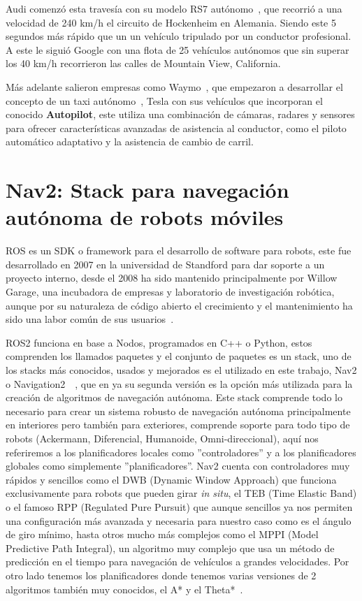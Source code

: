 Audi comenzó esta travesía con su modelo RS7 autónomo~\cite{audirs715}, que recorrió a una velocidad de 240 km/h el circuito de Hockenheim en Alemania. 
Siendo este 5 segundos más rápido que un un vehículo tripulado por un conductor profesional. A este le siguió Google con una flota de 25 
vehículos autónomos que sin superar los 40 km/h recorrieron las calles de Mountain View, California.

Más adelante salieron empresas como Waymo~\cite{waymo24}, que empezaron a desarrollar el concepto de un taxi autónomo~\cite{}, Tesla con sus vehículos que 
incorporan el conocido \textbf{Autopilot}, este utiliza una combinación de cámaras, radares y sensores para ofrecer características 
avanzadas de asistencia al conductor, como el piloto automático adaptativo y la asistencia de cambio de carril.

\section{Nav2: Stack para navegación autónoma de robots móviles}
ROS es un SDK o framework para el desarrollo de software para robots, este fue desarrollado en 2007 en la universidad de Standford para 
dar soporte a un proyecto interno, desde el 2008 ha sido mantenido principalmente por Willow Garage, una incubadora de empresas y 
laboratorio de investigación robótica, aunque por su naturaleza de código abierto el crecimiento y el mantenimiento ha sido una labor 
común de sus usuarios~\cite{ros2}.

ROS2 funciona en base a Nodos, programados en C++ o Python, estos comprenden los llamados paquetes y el conjunto de paquetes es un stack, 
uno de los stacks más conocidos, usados y mejorados es el utilizado en este trabajo, Nav2 o Navigation2~\cite{nav2}~, que en ya su segunda 
versión es la opción más utilizada para la creación de algoritmos de navegación autónoma.
Este stack comprende todo lo necesario para crear un sistema robusto de navegación autónoma principalmente en interiores pero también para exteriores,
comprende soporte para todo tipo de robots (Ackermann, Diferencial, Humanoide, Omni-direccional), aquí nos referiremos a los planificadores locales
como ''controladores'' y a los planificadores globales como simplemente ''planificadores''. Nav2 cuenta con controladores muy rápidos y 
sencillos como el DWB (Dynamic Window Approach) que funciona exclusivamente para robots que pueden girar \textit{in situ}, el TEB 
(Time Elastic Band) o el famoso RPP (Regulated Pure Pursuit) que aunque sencillos ya nos permiten una configuración más avanzada y necesaria
para nuestro caso como es el ángulo de giro mínimo, hasta otros mucho más complejos como el MPPI (Model Predictive Path Integral), un algoritmo 
muy complejo que usa un método de predicción en el tiempo para navegación de vehículos a grandes velocidades. Por otro lado tenemos los 
planificadores donde tenemos varias versiones de 2 algoritmos también muy conocidos, el A* y el Theta*~\cite{sun2023path}.

